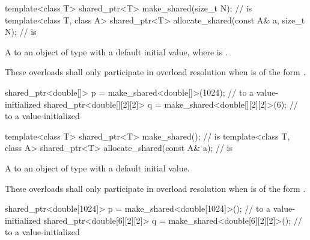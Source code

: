 %
%
\begin{itemdecl}
template<class T> shared_ptr<T>
  make_shared(size_t N);                                        //  is 
template<class T, class A>
  shared_ptr<T> allocate_shared(const A& a, size_t N);          //  is 
\end{itemdecl}

\begin{itemdescr}
\pnum
\returns A  to an object of type 
with a default initial value,
where  is .

\pnum
\remarks These overloads shall only participate in overload resolution
when  is of the form .

\pnum
\begin{example}
\begin{codeblock}
shared_ptr<double[]> p = make_shared<double[]>(1024);
  //  to a value-initialized 
shared_ptr<double[][2][2]> q = make_shared<double[][2][2]>(6);
  //  to a value-initialized 
\end{codeblock}
\end{example}
\end{itemdescr}

%
%
\begin{itemdecl}
template<class T>
  shared_ptr<T> make_shared();                                  //  is 
template<class T, class A>
  shared_ptr<T> allocate_shared(const A& a);                    //  is 
\end{itemdecl}

\begin{itemdescr}
\pnum
\returns A  to an object of type 
with a default initial value.

\pnum
\remarks These overloads shall only participate in overload resolution
when  is of the form .

\pnum
\begin{example}
\begin{codeblock}
shared_ptr<double[1024]> p = make_shared<double[1024]>();
  //  to a value-initialized 
shared_ptr<double[6][2][2]> q = make_shared<double[6][2][2]>();
  //  to a value-initialized 
\end{codeblock}
\end{example}
\end{itemdescr}

